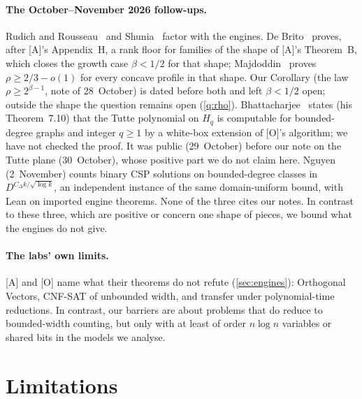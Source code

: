 \documentclass[10pt]{amsart}
\theoremstyle{plain}
\theoremstyle{definition}
\theoremstyle{remark}
\numberwithin{equation}{section}
\newcommand{\A}{\textup{[A]}}
\newcommand{\Oa}{\textup{[O]}}
\begin{document}
\paragraph{The October--November 2026 follow-ups.} Rudich and Rousseau~\cite{RR26} and
Shunia~\cite{Shu26} factor with the engines. De Brito~\cite{deBrito26} proves, after \A's Appendix~H,
a rank floor for families of the shape of \A's Theorem~B, which closes the growth case $\beta<1/2$ for
that shape; Majdoddin~\cite[Proposition~4.24]{Maj26} proves $\rho\ge2/3-o(1)$ for every concave profile
in that shape. Our Corollary (the law $\rho\ge2^{\beta-1}$, note of 28~October) is dated before both
and left $\beta<1/2$ open; outside the shape the question remains open (\cref{q:rho}).
Bhattacharjee~\cite{Bhattacharjee26} states (his Theorem~7.10) that the Tutte polynomial on $H_q$ is
computable for bounded-degree graphs and integer $q\ge1$ by a white-box extension of \Oa's algorithm; we
have not checked the proof. It was public (29~October) before our note on the Tutte plane
(30~October), whose positive part we do not claim here. Nguyen~\cite{Nguyen26} (2~November) counts binary CSP solutions on
bounded-degree classes in $D^{C_\Delta k/\sqrt{\log k}}$, an independent instance of the same
domain-uniform bound, with Lean on imported engine theorems. None of the three cites our notes. In
contrast to these three, which are positive or concern one shape of pieces, we bound what the engines
do not give.

\paragraph{The labs' own limits.} \A{} and \Oa{} name what their theorems do not refute
(\cref{sec:engines}): Orthogonal Vectors, CNF-SAT of unbounded width, and transfer under
polynomial-time reductions. In contrast, our barriers are about problems that do reduce to bounded-width
counting, but only with at least of order $n\log n$ variables or shared bits in the models we analyse.

\section{Limitations}\label{sec:limitations}
\end{document}
